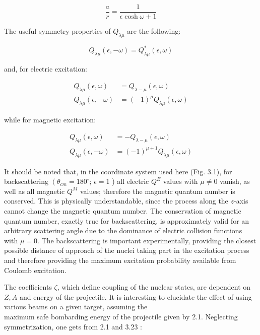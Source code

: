 \documentclass[10pt]{article}
\begin{document}
\begin{equation*}
\frac{a}{r}=\frac{1}{\epsilon \cosh \omega+1} \tag{3.29}
\end{equation*}


The useful symmetry properties of $Q_{\lambda \mu}$ are the following:


\begin{equation*}
Q_{\lambda \mu}(\epsilon,-\omega)=Q_{\lambda \mu}^{*}(\epsilon, \omega) \tag{3.30}
\end{equation*}


and, for electric excitation:


\begin{align*}
Q_{\lambda \mu}(\epsilon, \omega) & =Q_{\lambda-\mu}(\epsilon, \omega)  \tag{3.31}\\
Q_{\lambda \mu}(\epsilon,-\omega) & =(-1)^{\mu} Q_{\lambda \mu}(\epsilon, \omega) \tag{3.32}
\end{align*}


while for magnetic excitation:


\begin{align*}
Q_{\lambda \mu}(\epsilon, \omega) & =-Q_{\lambda-\mu}(\epsilon, \omega)  \tag{3.33}\\
Q_{\lambda \mu}(\epsilon,-\omega) & =(-1)^{\mu+1} Q_{\lambda \mu}(\epsilon, \omega) \tag{3.34}
\end{align*}


It should be noted that, in the coordinate system used here (Fig. 3.1), for backscattering $\left(\theta_{c m}=180^{\circ}\right.$; $\epsilon=1$ ) all electric $Q^{E}$ values with $\mu \neq 0$ vanish, as well as all magnetic $Q^{M}$ values; therefore the magnetic quantum number is conserved. This is physically understandable, since the process along the $z$-axis cannot change the magnetic quantum number. The conservation of magnetic quantum number, exactly true for backscattering, is approximately valid for an arbitrary scattering angle due to the dominance of electric collision functions with $\mu=0$. The backscattering is important experimentally, providing the closest possible distance of approach of the nuclei taking part in the excitation process and therefore providing the maximum excitation probability available from Coulomb excitation.

The coefficients $\zeta$, which define coupling of the nuclear states, are dependent on $Z, A$ and energy of the projectile. It is interesting to elucidate the effect of using various beams on a given target, assuming the\\
maximum safe bombarding energy of the projectile given by 2.1. Neglecting symmetrization, one gets from 2.1 and 3.23 :
\end{document}
